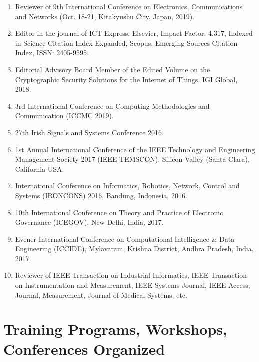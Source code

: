 \documentclass[11pt,a4paper]{moderncv}
\begin{document}
\begin{adjustwidth}{6em}{0pt}
\begin{enumerate}
		\item Reviewer of 9th International Conference on Electronics, Communications and Networks (Oct. 18-21, Kitakyushu City, Japan, 2019).
		
		\item Editor in the journal of ICT Express, Elsevier, Impact Factor: 4.317, Indexed in Science Citation Index Expanded, Scopus, Emerging Sources Citation Index, ISSN: 2405-9595.
		
		\item Editorial Advisory Board Member of the Edited Volume on the Cryptographic Security Solutions for the Internet of Things, IGI Global, 2018.
		
		\item 3rd International Conference on Computing Methodologies and Communication (ICCMC 2019).
		
		\item 27th Irish Signals and Systems Conference 2016.
		
		\item 1st Annual International Conference of the IEEE Technology and Engineering Management Society 2017 (IEEE TEMSCON), Silicon Valley (Santa Clara), California USA.
		
		\item International Conference on Informatics, Robotics, Network, Control and Systems (IRONCONS) 2016, Bandung, Indonesia, 2016.
		
		\item 10th International Conference on Theory and Practice of Electronic Governance (ICEGOV), New Delhi, India, 2017.
		
		\item Evener International Conference on Computational Intelligence \& Data Engineering (ICCIDE), Mylavaram, Krishna District, Andhra Pradesh, India, 2017.
		
		\item Reviewer of IEEE Transaction on Industrial Informatics, IEEE Transaction on Instrumentation and Measurement, IEEE Systems Journal, IEEE Access, Journal, Measurement, Journal of Medical Systems, etc.
		

	\end{enumerate}
\end{adjustwidth}



\section{\textbf{Training Programs, Workshops, Conferences Organized}}
\end{document}
